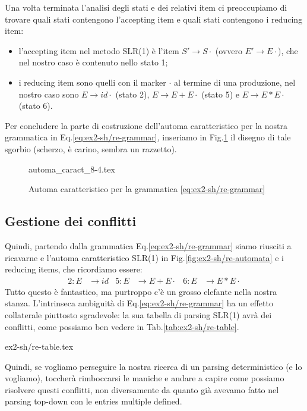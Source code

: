 \documentclass[class=book, crop=false, oneside, 12pt]{standalone}
\begin{document}
Una volta terminata l'analisi degli stati e dei relativi item ci preoccupiamo di trovare quali stati contengono l'accepting item e quali stati contengono i reducing item:
\begin{itemize}
    \item l'accepting item nel metodo SLR(1) è l'item \(S' \to S\cdot \) (ovvero \(E' \to E\cdot \)), che nel nostro caso è contenuto nello stato 1;
    \item i reducing item sono quelli con il marker \(\cdot\) al termine di una produzione, nel nostro caso sono \(E \to id \cdot\) (stato 2), \(E \to E+E \cdot\) (stato 5) e \(E \to E*E \cdot\) (stato 6).
\end{itemize}

Per concludere la parte di costruzione dell'automa caratteristico per la nostra grammatica in Eq.\ref{eq:ex2-sh/re-grammar}, inseriamo in Fig.\ref{fig:ex2-sh-re-automata} il disegno di tale sgorbio (scherzo, è carino, sembra un razzetto).
\begin{figure}[H]
    \center
	{automa_caract_8-4.tex}
    \caption{Automa caratteristico per la grammatica \ref{eq:ex2-sh/re-grammar}}
    \label{fig:ex2-sh-re-automata}
\end{figure}

\subsection{Gestione dei conflitti}
\label{subsec:precedence-conflicts}
Quindi, partendo dalla grammatica Eq.\ref{eq:ex2-sh/re-grammar} siamo riusciti a ricavarne e l'automa caratteristico SLR(1) in Fig.\ref{fig:ex2-sh/re-automata} e i reducing items, che ricordiamo essere:
\begin{align*}
    2: E &\to id & 5: E &\to E + E \cdot & 6: E &\to E * E \cdot
\end{align*}
Tutto questo è fantastico, ma purtroppo c'è un grosso elefante nella nostra stanza. L'intrinseca ambiguità di Eq.\ref{eq:ex2-sh/re-grammar} ha un effetto collaterale piuttosto sgradevole: la sua tabella di parsing SLR(1) avrà dei conflitti, come possiamo ben vedere in Tab.\ref{tab:ex2-sh/re-table}.
\begin{table}[H]
    \centering
    {ex2-sh/re-table.tex}
    \caption{tabella di parsing SLR(1) per la grammatica \ref{eq:ex2-sh/re-grammar}}
    \label{tab:ex2-sh/re-table}
\end{table}
\noindent Quindi, se vogliamo perseguire la nostra ricerca di un parsing deterministico (e lo vogliamo), toccherà rimboccarsi le maniche e andare a capire come possiamo risolvere questi conflitti, non diversamente da quanto già avevamo fatto nel parsing top-down con le entries multiple defined.
\end{document}
